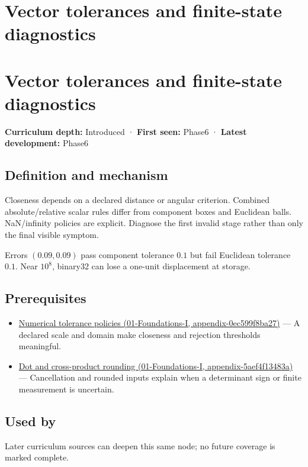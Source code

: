 \hypertarget{appendix-b5b83329215b}{}
\section*{Vector tolerances and finite-state diagnostics}
\section{Vector tolerances and finite-state diagnostics}\label{vector-tolerances-and-finite-state-diagnostics}

\textbf{Curriculum depth:} Introduced · \textbf{First seen:} Phase6 · \textbf{Latest development:} Phase6

\subsection{Definition and mechanism}\label{definition-and-mechanism}

Closeness depends on a declared distance or angular criterion. Combined absolute/relative scalar rules differ from component boxes and Euclidean balls. NaN/infinity policies are explicit. Diagnose the first invalid stage rather than only the final visible symptom.

Errors \((0.09,0.09)\) pass component tolerance \(0.1\) but fail Euclidean tolerance \(0.1\). Near \(10^8\), binary32 can lose a one-unit displacement at storage.

\subsection{Prerequisites}\label{prerequisites}

\begin{itemize}
\tightlist
\item
  \href{}{Numerical tolerance policies (01-Foundations-I, appendix-0ec599f8ba27)} --- A declared scale and domain make closeness and rejection thresholds meaningful.
\item
  \href{}{Dot and cross-product rounding (01-Foundations-I, appendix-5aef4f13483a)} --- Cancellation and rounded inputs explain when a determinant sign or finite measurement is uncertain.
\end{itemize}

\subsection{Used by}\label{used-by}

Later curriculum sources can deepen this same node; no future coverage is marked complete.

